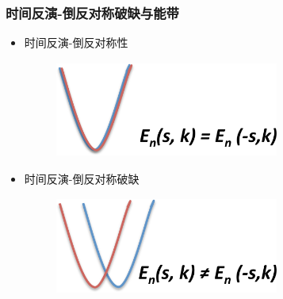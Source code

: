 {\frame
{
	\frametitle{时间反演-倒反对称破缺与能带}
	\begin{itemize}
		\item 时间反演-倒反对称性
\begin{figure}[h!]
\centering
\vspace*{-0.15in}
\includegraphics[height=1.25in,width=2.90in,viewport=0 0 1155 530,clip]{Figures/SOC_TRS-IS.png}
\label{Symmetry-TRS-IS}
\end{figure}
\item 时间反演-倒反对称破缺
\begin{figure}[h!]
\centering
\vspace*{-0.15in}
\includegraphics[height=1.25in,width=2.90in,viewport=0 0 1155 530,clip]{Figures/SOC_TRS-IS_breaking.png}
\label{Symmetry-TRS-IS-breaking}
\end{figure}
	\end{itemize}
}

}
